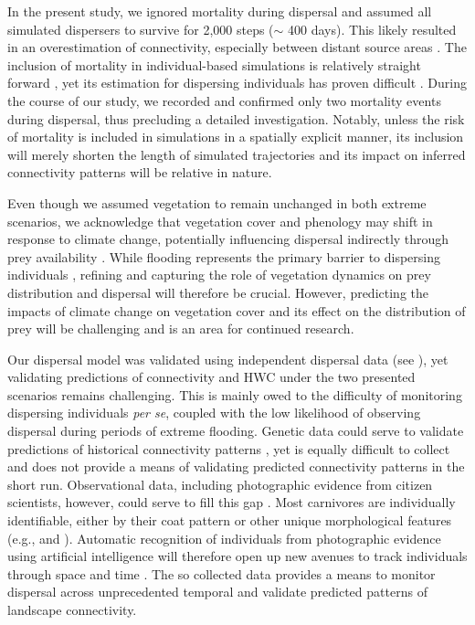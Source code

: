 \documentclass[../FinalThesis.tex]{subfiles}
\begin{document}
In the present study, we ignored mortality during dispersal and assumed all
simulated dispersers to survive for 2,000 steps ($\sim$ 400 days). This likely
resulted in an overestimation of connectivity, especially between distant source
areas \citep{Kramer-Schadt.2004, Diniz.2019, Day.2020, FletcherJr..2019}. The
inclusion of mortality in individual-based simulations is relatively straight
forward \citep{FletcherJr..2019, FletcherJr..2023}, yet its estimation for
dispersing individuals has proven difficult \citep{Behr.2023}. During the course
of our study, we recorded and confirmed only two mortality events during
dispersal, thus precluding a detailed investigation. Notably, unless the risk of
mortality is included in simulations in a spatially explicit manner, its
inclusion will merely shorten the length of simulated trajectories and its
impact on inferred connectivity patterns will be relative in nature.

Even though we assumed vegetation to remain unchanged in both extreme scenarios,
we acknowledge that vegetation cover and phenology may shift in response to
climate change, potentially influencing dispersal indirectly through prey
availability \citep{Bonyongo.2005}. While flooding represents the primary
barrier to dispersing individuals \citep{Cozzi.2020, Hofmann.2021,
Hofmann.2023}, refining and capturing the role of vegetation dynamics on prey
distribution and dispersal will therefore be crucial. However, predicting the
impacts of climate change on vegetation cover and its effect on the
distribution of prey will be challenging and is an area for continued research.

Our dispersal model was validated using independent dispersal data (see
\citealp{Hofmann.2023}), yet validating predictions of connectivity and HWC
under the two presented scenarios remains challenging. This is mainly owed to
the difficulty of monitoring dispersing individuals \textit{per se}, coupled
with the low likelihood of observing dispersal during periods of extreme
flooding. Genetic data could serve to validate predictions of historical
connectivity patterns \citep{Cushman.2010, Spear.2010}, yet is equally difficult
to collect and does not provide a means of validating predicted connectivity
patterns in the short run. Observational data, including photographic evidence
from citizen scientists, however, could serve to fill this gap
\citep{Marnewick.2014, Cozzi.2023}. Most carnivores are individually
identifiable, either by their coat pattern or other unique morphological
features (e.g., \citealp{Pennycuick.1970} and \citealp{Kelly.2001}). Automatic
recognition of individuals from photographic evidence using artificial
intelligence will therefore open up new avenues to track individuals through
space and time \citep{Cozzi.2023}. The so collected data provides a means to
monitor dispersal across unprecedented temporal and validate predicted patterns
of landscape connectivity.
\end{document}
